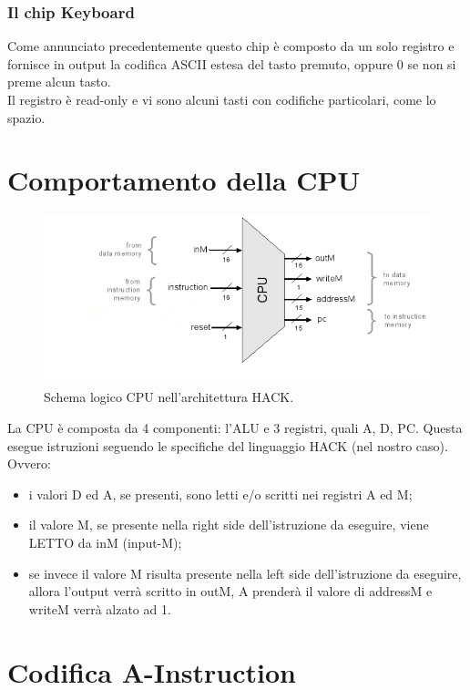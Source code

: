 \documentclass[12pt]{article}
\begin{document}
\subsubsection{Il chip Keyboard}
\label{sssec:keyboard_chip}
Come annunciato precedentemente questo chip è composto da un solo registro e fornisce in output la codifica ASCII estesa del tasto premuto, oppure 0 se non si preme alcun tasto.
\\
Il registro è read-only e vi sono alcuni tasti con codifiche particolari, come lo spazio.

\section{Comportamento della CPU}
\label{sec:CPU}
\begin{figure}[H]
    \centering
    \includegraphics[width=1\textwidth, height=.7\textheight,keepaspectratio]{realizzare_HACK/CPU.png} %
    \begin{center}
        \caption{\label{fig:come_funziona_CPU}Schema logico CPU nell'architettura HACK.} %
    \end{center}
\end{figure}
La CPU è composta da 4 componenti: l'ALU e 3 registri, quali A, D, PC.
Questa esegue istruzioni seguendo le specifiche del linguaggio HACK (nel nostro caso). Ovvero:
\begin{itemize}
    \item i valori D ed A, se presenti, sono letti e/o scritti nei registri A ed M;
    \item il valore M, se presente nella right side dell'istruzione da eseguire, viene LETTO da inM (input-M);
    \item se invece il valore M risulta presente nella left side dell'istruzione da eseguire, allora
            l'output verrà scritto in outM, A prenderà il valore di addressM e writeM verrà alzato ad 1.
\end{itemize}


\section{Codifica A-Instruction}
\end{document}
